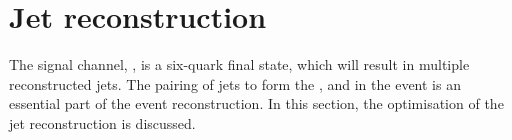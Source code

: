 \section{Jet reconstruction}

The signal channel, \eeToHHbbWWHad, is a six-quark final state, which will result in multiple reconstructed jets. The pairing of jets to form the \PH, \PWplus and \PWminus in the event is an essential part of the event reconstruction. In this section, the optimisation of the jet reconstruction is discussed.




